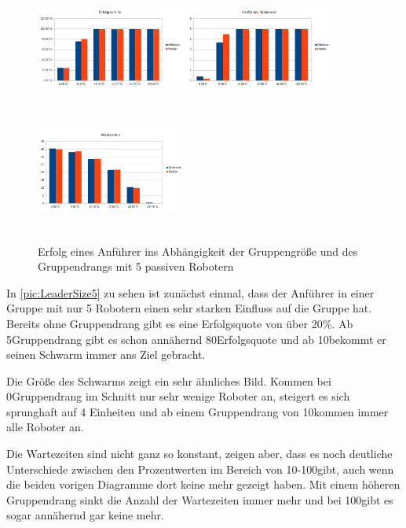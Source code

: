 \begin{figure}
	\includegraphics[width=4.9cm, height=4cm]{graphics/Statistics/Leader/FlockSize/5_1.png}
	\includegraphics[width=4.9cm, height=4cm]{graphics/Statistics/Leader/FlockSize/5_2.png}
	\includegraphics[width=4.9cm, height=4cm]{graphics/Statistics/Leader/FlockSize/5_3.png}
	\caption{Erfolg eines Anführer ins Abhängigkeit der Gruppengröße und des Gruppendrangs mit 5 passiven Robotern}
	\label{pic:LeaderSize5}
\end{figure}

In \autoref{pic:LeaderSize5} zu sehen ist zunächst einmal, dass der Anführer in einer Gruppe mit nur 5 Robotern einen sehr starken Einfluss auf die Gruppe hat. Bereits ohne Gruppendrang gibt es eine Erfolgsquote von über 20\%. Ab 5\per Gruppendrang gibt es schon annähernd 80\per Erfolgsquote und ab 10\per bekommt er seinen Schwarm immer ans Ziel gebracht.

Die Größe des Schwarms zeigt ein sehr ähnliches Bild. Kommen bei 0\per Gruppendrang im Schnitt nur sehr wenige Roboter an, steigert es sich sprunghaft auf 4 Einheiten und ab einem Gruppendrang von 10\per kommen immer alle Roboter an.

Die Wartezeiten sind nicht ganz so konstant, zeigen aber, dass es noch deutliche Unterschiede zwischen den Prozentwerten im Bereich von 10-100\per gibt, auch wenn die beiden vorigen Diagramme dort keine mehr gezeigt haben. Mit einem höheren Gruppendrang sinkt die Anzahl der Wartezeiten immer mehr und bei 100\per gibt es sogar annähernd gar keine mehr.

